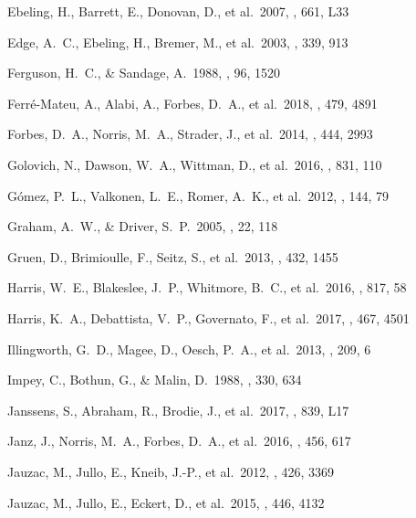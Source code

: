 \documentclass[iop,tighten,twocolumn,apj,floatfix]{emulateapj}
\begin{document}
\begin{thebibliography}{}
 Ebeling, H., Barrett, E., Donovan, D., et al.\ 2007, \apjl, 661, L33

 Edge, A.~C., Ebeling, H., Bremer, M., et al.\ 2003, \mnras, 339, 913

 Ferguson, H.~C., \& Sandage, A.\ 1988, \aj, 96, 1520

 Ferr{\'e}-Mateu, A., Alabi, A., Forbes, D.~A., et al.\ 2018, \mnras, 479, 4891

 Forbes, D.~A., Norris, M.~A., Strader, J., et al.\ 2014, \mnras, 444, 2993

 Golovich, N., Dawson, W.~A., Wittman, D., et al.\ 2016, \apj, 831, 110

 G{\'o}mez, P.~L., Valkonen, L.~E., Romer, A.~K., et al.\ 2012, \aj, 144, 79

 Graham, A.~W., \&
Driver, S.~P.\ 2005, \pasa, 22, 118

 Gruen, D., Brimioulle, F., Seitz, S., et al.\ 2013, \mnras, 432, 1455

 Harris, W.~E., Blakeslee, J.~P., Whitmore, B.~C., et al.\ 2016, \apj, 817, 58

 Harris, K.~A., Debattista, V.~P., Governato, F., et al.\ 2017, \mnras, 467, 4501

 Illingworth, G.~D.,
Magee, D., Oesch, P.~A., et al.\ 2013, \apjs, 209, 6

 Impey, C., Bothun, G., \& Malin, D.\ 1988, \apj, 330, 634

 Janssens, S., Abraham,
R., Brodie, J., et al.\ 2017, \apjl, 839, L17

 Janz, J., Norris, M.~A., Forbes, D.~A., et al.\ 2016, \mnras, 456, 617

 Jauzac, M., Jullo, E., Kneib, J.-P., et al.\ 2012, \mnras, 426, 3369

 Jauzac, M., Jullo, E., Eckert, D., et al.\ 2015, \mnras, 446, 4132


\end{thebibliography}
\end{document}
